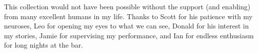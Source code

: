 This collection would not have been possible without the support (and enabling)
from many excellent humans in my life. Thanks to Scott for his patience with my
neuroses, Leo for opening my eyes to what we can see, Donald for his interest in
my stories, Jamie for supervising my performance, and Ian for endless enthusiasm
for long nights at the bar.
